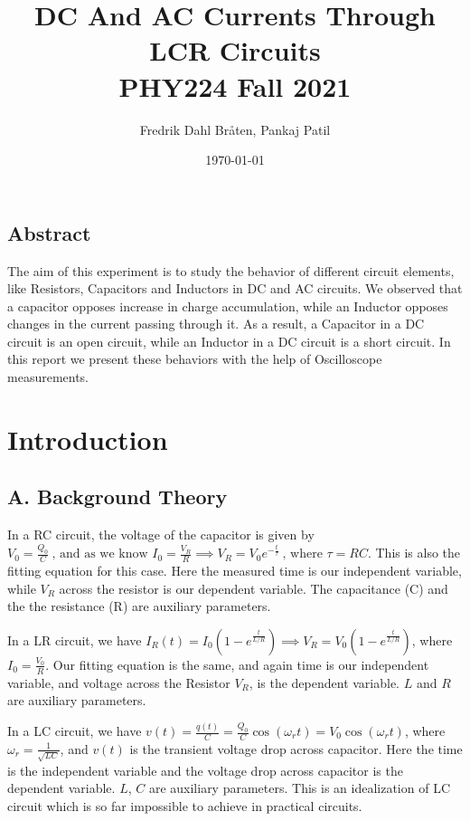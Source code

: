 \documentclass[a4paper,12pt]{article}
\begin{document}
\title{DC And AC Currents Through LCR Circuits \\
\large PHY224 Fall 2021}
\author{Fredrik Dahl Bråten, Pankaj Patil}
\date{\today}
\maketitle
\begin{center}
	\section*{Abstract}
\end{center}
The aim of this experiment is  to study the behavior of different circuit elements, like 
Resistors, Capacitors and Inductors in DC and AC circuits. We observed that a capacitor opposes
increase in charge accumulation, while an Inductor opposes changes in the current passing through it. As a result, a Capacitor in a DC circuit is an open
circuit, while an Inductor in a DC circuit is a short circuit. In this report we present 
these behaviors with the help of Oscilloscope measurements.

\section{Introduction}

\subsection*{A. Background Theory}
In a RC circuit, the voltage of the capacitor is given by $V_0 = \frac{Q_0}{C} \ \text{, and as we know  } I_0 = \frac{V_R}{R} \implies V_R = V_0e^{-\frac{t}{\tau}}\ \text{, where } \tau = RC$. This is also 
the fitting equation for this case. Here the measured time is our independent variable, while $V_R$ across the resistor is our dependent variable. The capacitance (C) and the the resistance (R) are 
auxiliary parameters.

In a LR circuit, we have $I_R(t) = I_0(1-e^{\frac{t}{L/R}}) \implies V_R =  V_0(1-e^{\frac{t}{L/R}})$, where $I_0  = \frac{V_0}{R}$. Our fitting equation is the same, and again time is our 
independent variable, and voltage across the Resistor $V_R$, is the dependent variable. $L$ and $R$ are auxiliary parameters.

In a LC circuit, we have $v(t) = \frac{q(t)}{C} = \frac{Q_0}{C}\cos(\omega_r t) = V_0\cos(\omega_r t)$, where $\omega_r = \frac{1}{\sqrt{LC}}$, and 
$v(t)$ is the transient voltage drop across capacitor. Here the time is the independent variable and the voltage drop across capacitor is the dependent variable. 
$L$, $C$ are auxiliary parameters. This is an idealization of LC circuit which is so far impossible to achieve in practical circuits.
\end{document}
